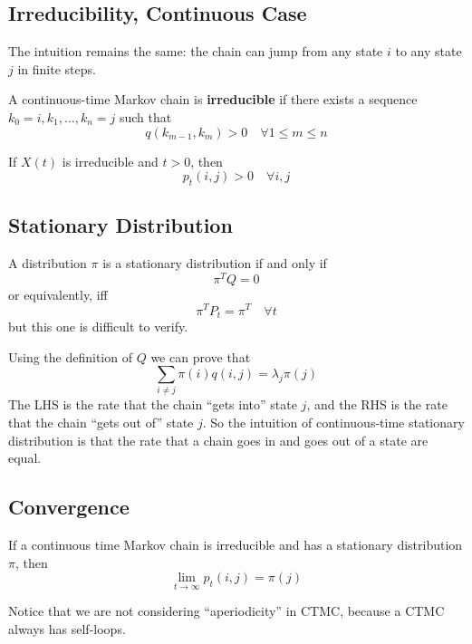     \subsection{Irreducibility, Continuous Case}
        The intuition remains the same: the chain can jump from any state $i$ to any state $j$ in finite steps.
        \begin{definition}
            A continuous-time Markov chain is \textbf{irreducible} if there exists a sequence $k_0 = i, k_1, \dots, k_n=j$ such that
            \[ q(k_{m-1},k_m) > 0 \quad \forall 1 \le m \le n \]
        \end{definition}

        \begin{lemma}\label{lem:NecessaryConditionOfIrreducibility}
            If $X(t)$ is irreducible and $t>0$, then
            \[ p_t(i,j) > 0 \quad \forall i,j \]
        \end{lemma}

    \subsection{Stationary Distribution}
        \begin{lemma}\label{lem:ContinuousTimeStationaryDistribution}
            A distribution $\pi$ is a stationary distribution if and only if
            \[ \pi^T Q = 0 \]
            or equivalently, iff
            \[ \pi^T P_t = \pi^T \quad \forall t \]
            but this one is difficult to verify.
        \end{lemma}
        \begin{remark}
            Using the definition of $Q$ we can prove that
            \[ \sum_{i \neq j}\pi(i)q(i,j) = \lambda_j\pi(j) \]
            The LHS is the rate that the chain ``gets into'' state $j$, and the RHS is the rate that the chain ``gets out of'' state $j$. So the intuition of continuous-time stationary distribution is that the rate that a chain goes in and goes out of a state are equal.
        \end{remark}

    \subsection{Convergence}
        \begin{theorem}\label{thm:ConvergenceOfCTMarkovChain}
            If a continuous time Markov chain is irreducible and has a stationary distribution $\pi$, then
            \[ \lim_{t\to\infty}p_t(i,j) = \pi(j) \]
        \end{theorem}
        \begin{remark}
            Notice that we are not considering ``aperiodicity'' in CTMC, because a CTMC always has self-loops.
        \end{remark}

